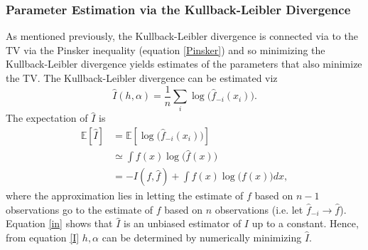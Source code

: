 \documentclass[
twoside,
openright,
titlepage,
numbers=noenddot,
headinclude,%
footinclude=true,
dottedtoc, %
ngerman,
american, %
pagesize=pdftex,
]{book}
\begin{document}
	\subsubsection{Parameter Estimation via the Kullback-Leibler Divergence}
	As mentioned previously, the Kullback-Leibler divergence is connected via to the TV via the Pinsker inequality (equation \eqref{Pinsker}) and so minimizing the Kullback-Leibler divergence yields estimates of the parameters that also minimize the TV. The Kullback-Leibler divergence can be estimated viz
	\begin{equation}
		\hat{I}(h,\alpha)=\frac{1}{n}\sum_{i}\log\big(\hat{f}_{-i}(x_i)\big).
		\label{I}
	\end{equation}
	The expectation of $\hat{I}$ is
	\begin{equation}
		\begin{split}
			\mathbb{E}[\hat{I}]&=\mathbb{E}[\log\big(\hat{f}_{-i}(x_i)\big)]\\
			&\simeq\int f(x)\log\big(\hat{f}(x)\big)\\
			&=-I(f,\hat{f})+\int f(x)\log\big(f(x)\big)dx,
		\end{split}
		\label{in}
	\end{equation}
	where the approximation lies in letting the estimate of $f$ based on $n-1$ observations go to the estimate of $f$ based on $n$ observations (i.e. let $\hat{f}_{-i}\rightarrow \hat{f}$). Equation \eqref{in} shows that $\hat{I}$ is an unbiased estimator of $I$ up to a constant. Hence, from equation \eqref{I} $h,\alpha$ can be determined by numerically minimizing $\hat{I}$.
	
\end{document}
